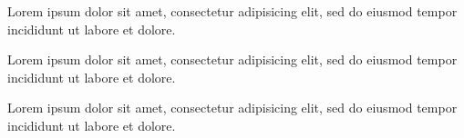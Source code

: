 \documentclass{article}
\begin{document}
Lorem ipsum dolor sit amet, consectetur adipisicing elit, sed do eiusmod
tempor incididunt ut labore et dolore.

\onehalfspacing

Lorem ipsum dolor sit amet, consectetur adipisicing elit, sed do eiusmod
tempor incididunt ut labore et dolore.

\doublespacing

Lorem ipsum dolor sit amet, consectetur adipisicing elit, sed do eiusmod
tempor incididunt ut labore et dolore.
\end{document}
